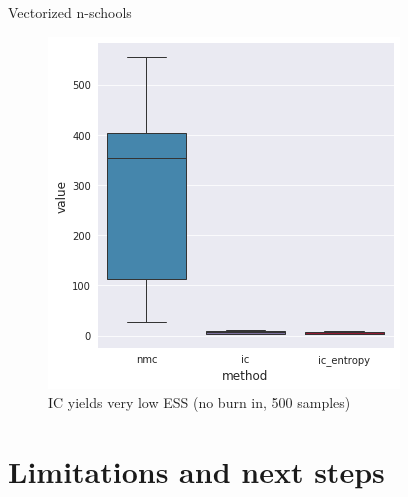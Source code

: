 \documentclass{beamer}
\begin{document}
\begin{frame}[fragile]{Vectorized n-schools}
	\begin{figure}
	    \centering
	    \includegraphics[width=0.4\linewidth]{figures/nschools-ic-neff.png}
	    \caption{IC yields very low ESS (no burn in, 500 samples)}
	\end{figure}
\end{frame}

\section{Limitations and next steps}
\end{document}
